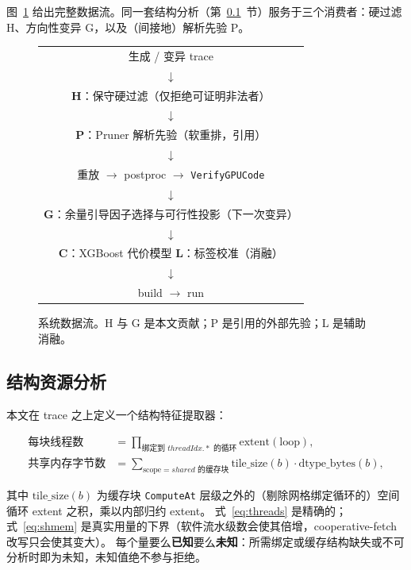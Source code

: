 \documentclass[UTF8]{ctexart}
\begin{document}
图~\ref{fig:flow} 给出完整数据流。同一套结构分析（第~\ref{sec:features}~节）服务于三个消费者：硬过滤 H、方向性变异 G，以及（间接地）解析先验 P。

\begin{figure}[t]
\centering
\begin{tabular}{c}
生成 / 变异 trace \\
$\downarrow$ \\
\textbf{H}：保守硬过滤（仅拒绝可证明非法者） \\
$\downarrow$ \\
\textbf{P}：Pruner 解析先验（软重排，引用） \\
$\downarrow$ \\
重放 $\rightarrow$ postproc $\rightarrow$ \texttt{VerifyGPUCode} \\
$\downarrow$ \\
\textbf{G}：余量引导因子选择与可行性投影（下一次变异） \\
$\downarrow$ \\
\textbf{C}：XGBoost 代价模型 \quad \textbf{L}：标签校准（消融） \\
$\downarrow$ \\
build $\rightarrow$ run
\end{tabular}
\caption{系统数据流。H 与 G 是本文贡献；P 是引用的外部先验；L 是辅助消融。}
\label{fig:flow}
\end{figure}

\subsection{结构资源分析}
\label{sec:features}

本文在 trace 之上定义一个结构特征提取器：

\begin{align}
\text{每块线程数} &= \prod_{\text{绑定到 } threadIdx.* \text{ 的循环}} \text{extent}(\text{loop}), \label{eq:threads}\\
\text{共享内存字节数} &= \sum_{\text{scope}=shared \text{ 的缓存块}} \text{tile\_size}(b) \cdot \text{dtype\_bytes}(b), \label{eq:shmem}
\end{align}

其中 $\text{tile\_size}(b)$ 为缓存块 \texttt{ComputeAt} 层级之外的（剔除网格绑定循环的）空间循环 extent 之积，乘以内部归约 extent。
式~\eqref{eq:threads} 是精确的；式~\eqref{eq:shmem} 是真实用量的下界（软件流水级数会使其倍增，cooperative-fetch 改写只会使其变大）。
每个量要么\textbf{已知}要么\textbf{未知}：所需绑定或缓存结构缺失或不可分析时即为未知，未知值绝不参与拒绝。
\end{document}
